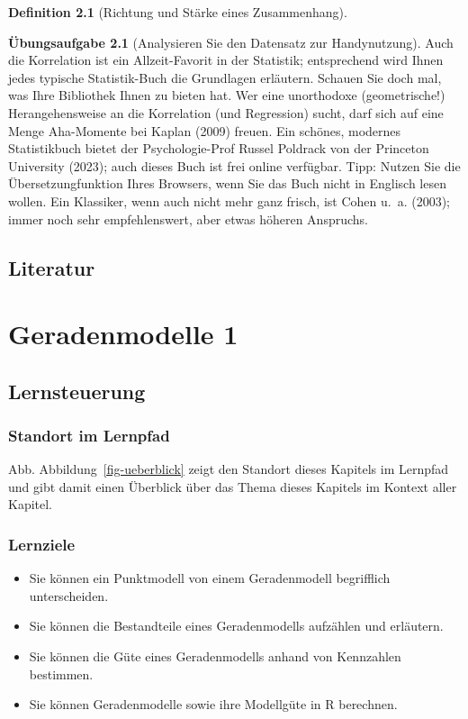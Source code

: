 \documentclass[
  a4paper,
  DIV=11]{scrreprt}
\providecommand{\tightlist}{%
  \setlength{\itemsep}{0pt}\setlength{\parskip}{0pt}}\usepackage{longtable,booktabs,array}
\theoremstyle{definition}
\newtheorem{exercise}{Übungsaufgabe}[chapter]
\theoremstyle{definition}
\theoremstyle{definition}
\newtheorem{definition}{Definition}[chapter]
\theoremstyle{remark}
\begin{document}
\begin{definition}[Richtung und Stärke eines
Zusammenhang]
\begin{exercise}[Analysieren Sie den Datensatz zur
Handynutzung]
Auch die Korrelation ist ein Allzeit-Favorit in der Statistik;
entsprechend wird Ihnen jedes typische Statistik-Buch die Grundlagen
erläutern. Schauen Sie doch mal, was Ihre Bibliothek Ihnen zu bieten
hat. Wer eine unorthodoxe (geometrische!) Herangehensweise an die
Korrelation (und Regression) sucht, darf sich auf eine Menge Aha-Momente
bei Kaplan (2009) freuen. Ein schönes, modernes Statistikbuch bietet der
Psychologie-Prof Russel Poldrack von der Princeton University (2023);
auch dieses Buch ist frei online verfügbar. Tipp: Nutzen Sie die
Übersetzungfunktion Ihres Browsers, wenn Sie das Buch nicht in Englisch
lesen wollen. Ein Klassiker, wenn auch nicht mehr ganz frisch, ist Cohen
u.~a. (2003); immer noch sehr empfehlenswert, aber etwas höheren
Anspruchs.

\section{Literatur}\label{literatur-6}

\chapter{Geradenmodelle 1}\label{sec-gerade1}

\section{Lernsteuerung}\label{lernsteuerung-7}

\subsection{Standort im Lernpfad}\label{standort-im-lernpfad-7}

Abb. Abbildung~\ref{fig-ueberblick} zeigt den Standort dieses Kapitels
im Lernpfad und gibt damit einen Überblick über das Thema dieses
Kapitels im Kontext aller Kapitel.

\subsection{Lernziele}\label{lernziele-8}

\begin{itemize}
\tightlist
\item
  Sie können ein Punktmodell von einem Geradenmodell begrifflich
  unterscheiden.
\item
  Sie können die Bestandteile eines Geradenmodells aufzählen und
  erläutern.
\item
  Sie können die Güte eines Geradenmodells anhand von Kennzahlen
  bestimmen.
\item
  Sie können Geradenmodelle sowie ihre Modellgüte in R berechnen.
\end{itemize}


\end{exercise}
\end{definition}
\end{document}
